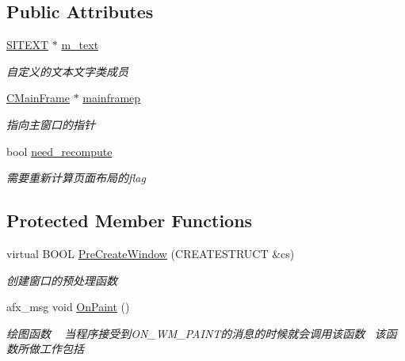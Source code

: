 \subsection*{Public Attributes}
\begin{DoxyCompactItemize}
\item 
\hyperlink{class_s_i_t_e_x_t}{S\+I\+T\+E\+XT} $\ast$ \hyperlink{class_c_child_view_a7a8d14e1c1adfb50fa6e033ebc05a357}{m\+\_\+text}
\begin{DoxyCompactList}\small\item\em 自定义的文本文字类成员 \end{DoxyCompactList}\item 
\mbox{\label{class_c_child_view_a5c52f5e75191a707906b1334f0281376}} 
\hyperlink{class_c_main_frame}{C\+Main\+Frame} $\ast$ \hyperlink{class_c_child_view_a5c52f5e75191a707906b1334f0281376}{mainframep}
\begin{DoxyCompactList}\small\item\em 指向主窗口的指针 \end{DoxyCompactList}\item 
\mbox{\label{class_c_child_view_a7a2763ed4f49e10e4efc2c89fdf3bbbf}} 
bool \hyperlink{class_c_child_view_a7a2763ed4f49e10e4efc2c89fdf3bbbf}{need\+\_\+recompute}
\begin{DoxyCompactList}\small\item\em 需要重新计算页面布局的flag \end{DoxyCompactList}\end{DoxyCompactItemize}
\subsection*{Protected Member Functions}
\begin{DoxyCompactItemize}
\item 
\mbox{\label{class_c_child_view_a07e87a6c3606422ff10d45a47d702c7e}} 
virtual B\+O\+OL \hyperlink{class_c_child_view_a07e87a6c3606422ff10d45a47d702c7e}{Pre\+Create\+Window} (C\+R\+E\+A\+T\+E\+S\+T\+R\+U\+CT \&cs)
\begin{DoxyCompactList}\small\item\em 创建窗口的预处理函数 \end{DoxyCompactList}\item 
afx\+\_\+msg void \hyperlink{class_c_child_view_a8ea6d42631a4f9f446923ff864b239ab}{On\+Paint} ()
\begin{DoxyCompactList}\small\item\em 绘图函数 ~\newline
当程序接受到\+O\+N\+\_\+\+W\+M\+\_\+\+P\+A\+I\+N\+T的消息的时候就会调用该函数~\newline
该函数所做工作包括~\newline
\end{DoxyCompactList}\end{DoxyCompactItemize}


